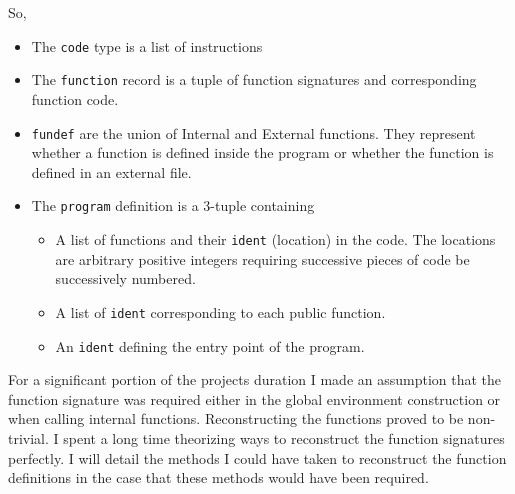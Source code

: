 So,

\begin{itemize}
    \item The \texttt{code} type is a list of instructions
    \item The \texttt{function} record is a tuple of function signatures and corresponding function code.
    \item \texttt{fundef} are the union of Internal and External functions. They represent whether a function is defined inside the program or whether the function is defined in an external file.
    \item The \texttt{program} definition is a 3-tuple containing 
    \begin{itemize}
        \item A list of functions and their \texttt{ident} (location) in the code. The locations are arbitrary positive integers requiring successive pieces of code be successively numbered.
        \item A list of \texttt{ident} corresponding to each public function.
        \item An \texttt{ident} defining the entry point of the program.
    \end{itemize}
\end{itemize}

For a significant portion of the projects duration I made an assumption that the function signature was required either in the global environment construction or when calling internal functions. Reconstructing the functions proved to be non-trivial. I spent a long time theorizing ways to reconstruct the function signatures perfectly. I will detail the methods I could have taken to reconstruct the function definitions in the case that these methods would have been required.

